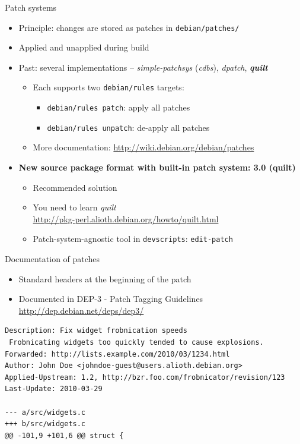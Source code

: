 \documentclass[10pt,final]{beamer}
\begin{document}
\begin{frame}{Patch systems}
  \begin{itemize}
  \item Principle: changes are stored as patches in \texttt{debian/patches/}
    \br
  \item Applied and unapplied during build
    \br
  \item Past: several implementations -- \textsl{simple-patchsys} (\textsl{cdbs}),
    \textsl{dpatch}, \textbf{\textsl{quilt}}
    \begin{itemize}
  \item Each supports two \texttt{debian/rules} targets:
    \begin{itemize}
    \item \texttt{debian/rules patch}: apply all patches
    \item \texttt{debian/rules unpatch}: de-apply all patches
    \end{itemize}
	  \hbr
  \item More documentation: \url{http://wiki.debian.org/debian/patches}
  \end{itemize}
  \br
  \item \textbf{New source package format with built-in patch system: 3.0 (quilt)}
  \begin{itemize}
  \item Recommended solution
	  \hbr
  \item You need to learn \textsl{quilt}\\
    \url{http://pkg-perl.alioth.debian.org/howto/quilt.html}
    \hbr
  \item Patch-system-agnostic tool in \texttt{devscripts}: \texttt{edit-patch}
  \end{itemize}
  \end{itemize}
\end{frame}

\begin{frame}[fragile]{Documentation of patches}
  \begin{itemize}
	  \item Standard headers at the beginning of the patch
    \br
  \item Documented in DEP-3 - Patch Tagging Guidelines\\
    \url{http://dep.debian.net/deps/dep3/}
  \end{itemize}
  \vfill
\seprule
  \begin{lstlisting}[basicstyle=\ttfamily\footnotesize]
Description: Fix widget frobnication speeds
 Frobnicating widgets too quickly tended to cause explosions.
Forwarded: http://lists.example.com/2010/03/1234.html
Author: John Doe <johndoe-guest@users.alioth.debian.org>
Applied-Upstream: 1.2, http://bzr.foo.com/frobnicator/revision/123
Last-Update: 2010-03-29

--- a/src/widgets.c
+++ b/src/widgets.c
@@ -101,9 +101,6 @@ struct {
\end{lstlisting}
\end{frame}
\end{document}

